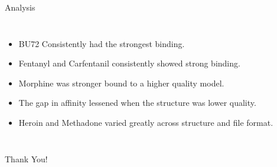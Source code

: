 \documentclass{beamer}
\begin{document}
\begin{frame}{Analysis}
    \begin{columns}
         \footnotesize
            \begin{itemize}
                \item BU72 Consistently had the strongest binding.
                \item Fentanyl and Carfentanil consistently showed strong binding.
                \item Morphine was stronger bound to a higher quality model.
                \item The gap in affinity lessened when the structure was lower quality.
                \item Heroin and Methadone varied greatly across structure and file format.
            
      \end{itemize}
    \end{columns}
\end{frame}

\begin{frame}{Thank You!}
\end{frame}
\end{document}
